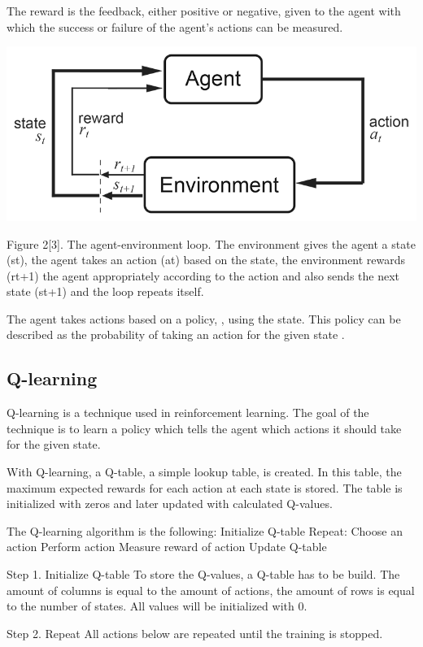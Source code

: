 \documentclass{article}
\begin{document}
The reward is the feedback, either positive or negative, given to the agent with which the success or failure of the agent’s actions can be measured.

\includegraphics[width=\paperwidth]{reinforcement_learning}

Figure 2[3]. The agent-environment loop. The environment gives the agent a state (st), the agent takes an action (at) based on the state, the environment rewards (rt+1) the agent appropriately according to the action and also sends the next state (st+1) and the loop repeats itself.

The agent takes actions based on a policy, , using the state. This policy can be described as the probability of taking an action  for the given state . 

\subsection{Q-learning}
Q-learning is a technique used in reinforcement learning. The goal of the technique is to learn a policy which tells the agent which actions it should take for the given state. 

With Q-learning, a Q-table, a simple lookup table, is created. In this table, the maximum expected rewards for each action at each state is stored. The table is initialized with zeros and later updated with calculated Q-values.

The Q-learning algorithm is the following:
Initialize Q-table
Repeat:
Choose an action
Perform action
Measure reward of action
Update Q-table

Step 1. Initialize Q-table
To store the Q-values, a Q-table has to be build. The amount of columns is equal to the amount of actions, the amount of rows is equal to the number of states. All values will be initialized with 0.

Step 2. Repeat
All actions below are repeated until the training is stopped.
\end{document}
